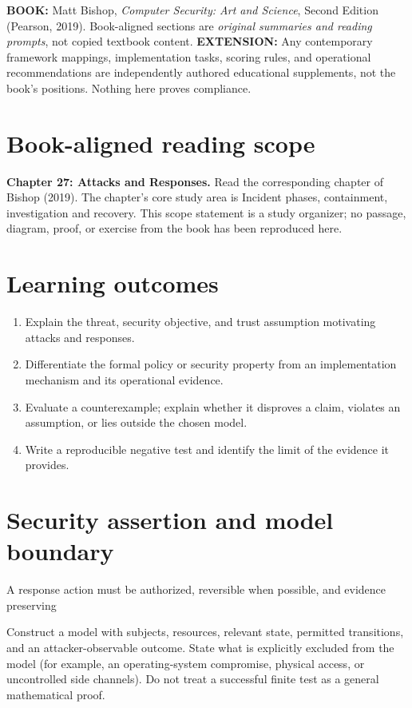 \documentclass[10pt,letterpaper]{article}
\begin{document}
\makedoctocpage
\begin{notebox}
\textbf{BOOK:} Matt Bishop, \emph{Computer Security: Art and Science}, Second Edition (Pearson, 2019). Book-aligned sections are \emph{original summaries and reading prompts}, not copied textbook content.
\textbf{EXTENSION:} Any contemporary framework mappings, implementation tasks, scoring rules, and operational recommendations are independently authored educational supplements, not the book's positions. Nothing here proves compliance.
\end{notebox}
\section{Book-aligned reading scope}
\textbf{Chapter 27: Attacks and Responses.} Read the corresponding chapter of Bishop (2019). The chapter's core study area is Incident phases, containment, investigation and recovery. This scope statement is a study organizer; no passage, diagram, proof, or exercise from the book has been reproduced here.
\section{Learning outcomes}
\begin{enumerate}
\item Explain the threat, security objective, and trust assumption motivating attacks and responses.
\item Differentiate the formal policy or security property from an implementation mechanism and its operational evidence.
\item Evaluate a counterexample; explain whether it disproves a claim, violates an assumption, or lies outside the chosen model.
\item Write a reproducible negative test and identify the limit of the evidence it provides.
\end{enumerate}
\section{Security assertion and model boundary}
\begin{infobox}
A response action must be authorized, reversible when possible, and evidence preserving
\end{infobox}
Construct a model with subjects, resources, relevant state, permitted transitions, and an attacker-observable outcome. State what is explicitly excluded from the model (for example, an operating-system compromise, physical access, or uncontrolled side channels). Do not treat a successful finite test as a general mathematical proof.
\end{document}
